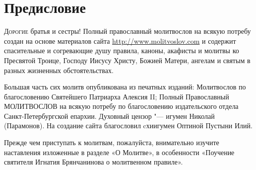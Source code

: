 \chapter*{Предисловие}

\lettrine{Д}{орогие} братья и сестры! Полный православный молитвослов на всякую потребу создан на основе материалов сайта \url{http://www.molitvoslov.com} и содержит спасительные и согревающие душу правила, каноны, акафисты и молитвы ко Пресвятой Троице, Господу Иисусу Христу, Божией Матери, ангелам и святым в разных жизненных обстоятельствах.

Большая часть сих молитв опубликована из печатных изданий: Молитвослов по благословению Святейшего Патриарха Алексия II; Полный Православный МОЛИТВОСЛОВ на всякую потребу по благословению издательского отдела Санкт-Петербургской епархии. Духовный цензор "--- игумен Николай (Парамонов). На создание сайта благословил cхиигумен Оптиной Пустыни Илий.

Прежде чем приступать к молитвам, пожалуйста, внимательно изучите наставления изложенные в разделе «О Молитве», в особенности «Поучение святителя Игнатия Брянчанинова о молитвенном правиле».

